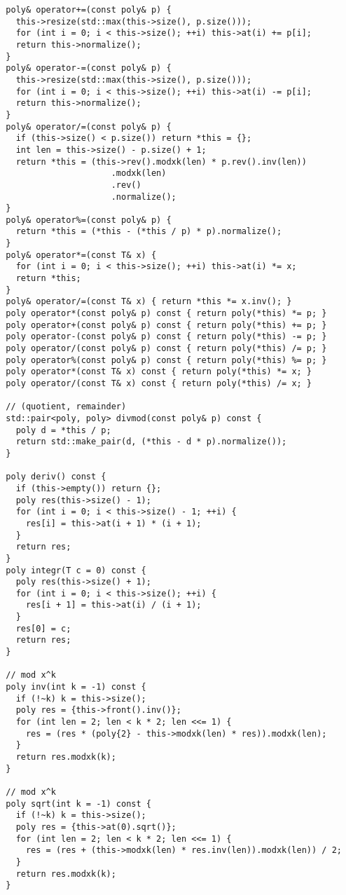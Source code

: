 \documentclass[6pt]{article}
\begin{document}
\begin{multicols}{2}
\begin{lstlisting}
  poly& operator+=(const poly& p) {
    this->resize(std::max(this->size(), p.size()));
    for (int i = 0; i < this->size(); ++i) this->at(i) += p[i];
    return this->normalize();
  }
  poly& operator-=(const poly& p) {
    this->resize(std::max(this->size(), p.size()));
    for (int i = 0; i < this->size(); ++i) this->at(i) -= p[i];
    return this->normalize();
  }
  poly& operator/=(const poly& p) {
    if (this->size() < p.size()) return *this = {};
    int len = this->size() - p.size() + 1;
    return *this = (this->rev().modxk(len) * p.rev().inv(len))
                       .modxk(len)
                       .rev()
                       .normalize();
  }
  poly& operator%=(const poly& p) {
    return *this = (*this - (*this / p) * p).normalize();
  }
  poly& operator*=(const T& x) {
    for (int i = 0; i < this->size(); ++i) this->at(i) *= x;
    return *this;
  }
  poly& operator/=(const T& x) { return *this *= x.inv(); }
  poly operator*(const poly& p) const { return poly(*this) *= p; }
  poly operator+(const poly& p) const { return poly(*this) += p; }
  poly operator-(const poly& p) const { return poly(*this) -= p; }
  poly operator/(const poly& p) const { return poly(*this) /= p; }
  poly operator%(const poly& p) const { return poly(*this) %= p; }
  poly operator*(const T& x) const { return poly(*this) *= x; }
  poly operator/(const T& x) const { return poly(*this) /= x; }

  // (quotient, remainder)
  std::pair<poly, poly> divmod(const poly& p) const {
    poly d = *this / p;
    return std::make_pair(d, (*this - d * p).normalize());
  }

  poly deriv() const {
    if (this->empty()) return {};
    poly res(this->size() - 1);
    for (int i = 0; i < this->size() - 1; ++i) {
      res[i] = this->at(i + 1) * (i + 1);
    }
    return res;
  }
  poly integr(T c = 0) const {
    poly res(this->size() + 1);
    for (int i = 0; i < this->size(); ++i) {
      res[i + 1] = this->at(i) / (i + 1);
    }
    res[0] = c;
    return res;
  }

  // mod x^k
  poly inv(int k = -1) const {
    if (!~k) k = this->size();
    poly res = {this->front().inv()};
    for (int len = 2; len < k * 2; len <<= 1) {
      res = (res * (poly{2} - this->modxk(len) * res)).modxk(len);
    }
    return res.modxk(k);
  }

  // mod x^k
  poly sqrt(int k = -1) const {
    if (!~k) k = this->size();
    poly res = {this->at(0).sqrt()};
    for (int len = 2; len < k * 2; len <<= 1) {
      res = (res + (this->modxk(len) * res.inv(len)).modxk(len)) / 2;
    }
    return res.modxk(k);
  }


\end{lstlisting}
\end{multicols}
\end{document}
